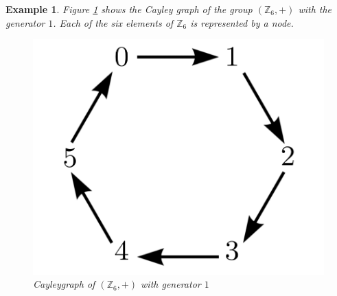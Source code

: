 \documentclass[12pt,a4paper]{article}
\theoremstyle{custom}
\newtheorem*{example}{Example}
\begin{document}
\begin{example}

Figure \ref{Figure_Cayleygraph} shows the Cayley graph of the group $(\mathbb{Z}_{6}, +)$ with the generator $1$. Each of the six elements of $\mathbb{Z}_6$ is represented by a node.

\begin{figure}[H]
\centering
\includegraphics[scale=0.7]{Cayleygraph3.png}
\caption{Cayleygraph of $(\mathbb{Z}_ 6, +)$ with generator $1$}
\label{Figure_Cayleygraph}
\end{figure}
\end{example}
\end{document}

